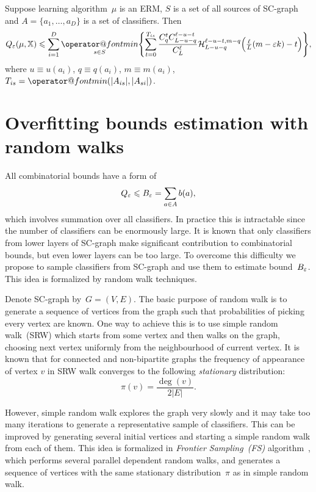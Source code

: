 \documentclass{article}
\makeatletter
\let\cite\citep
\def\AA{A}
\def\XX{\mathbb{X}}
\renewcommand{\leq}{\leqslant}
\renewcommand{\min}{\mathop{\operator@font min}\limits}
\renewcommand{\emph}[1]{\textit{#1}}
\makeatother
\begin{document}
\begin{theorem}
\label{bound_sources_theorem}
    Suppose learning algorithm~$\mu$ is an ERM,
    $S$ is a set of all sources of SC-graph and
    $\AA = \{a_1, \dots, a_D\}$ is a set of classifiers. Then
    \begin{equation}
    \label{bound_sources}
        Q_\eps (\mu, \XX)
        \leq
        \sum_{i = 1}^{D}
            \min_{s \in S}
            \Biggl\{
                \sum_{t = 0}^{T_{is}}
                    \frac{
                        C_q^t C_{L - u - q}^{\ell - u - t}
                    }{
                        C_L^\ell
                    }
                    \mathcal{H}_{L - u - q}^{\ell - u - t, m - q}
                    \Bigl(
                        \tfrac{\ell}{L} (m - \eps k) - t
                    \Bigr)
            \Biggr\},
    \end{equation}
    where
    $u \equiv u(a_i)$,
    $q \equiv q(a_i)$,
    $m \equiv m(a_i)$,
    $T_{is} = \min(|A_{is}|, |A_{si}|)$.
\end{theorem}

\section{Overfitting bounds estimation with random walks}
All combinatorial bounds have a form of
\[
    Q_\eps \leq B_\eps = \sum_{a \in \AA} b(a),
\]
which involves summation over all classifiers.
In practice this is intractable since the number of classifiers
can be enormously large.
It is known that only classifiers from lower layers of SC-graph
make significant contribution to combinatorial bounds,
but even lower layers can be too large.
To overcome this difficulty we propose to sample classifiers from SC-graph and use them to estimate bound~$B_\varepsilon$.
This idea is formalized by random walk techniques.

Denote SC-graph by~$G = (V, E)$.
The basic purpose of random walk is to generate a sequence of vertices from the graph
such that probabilities of picking every vertex are known.
One way to achieve this is to use simple random walk~(SRW) which starts from some vertex
and then walks on the graph, choosing next vertex uniformly from the neighbourhood of current vertex.
It is known that for connected and non-bipartite graphs the frequency of appearance of vertex $v$ in SRW walk
converges to the following \emph{stationary} distribution:
\[
    \pi(v) = \frac{\deg(v)}{2 |E|}.
\]

However, simple random walk explores the graph very slowly
and it may take too many iterations to generate a representative sample
of classifiers.
This can be improved by generating several initial vertices and starting
a simple random walk from each of them.
This idea is formalized in \emph{Frontier Sampling~(FS)} algorithm~\cite{ribeiro2010multidimensional},
which performs several parallel dependent random walks,
and generates a sequence of vertices with the same stationary distribution~$\pi$
as in simple random walk.
\end{document}
